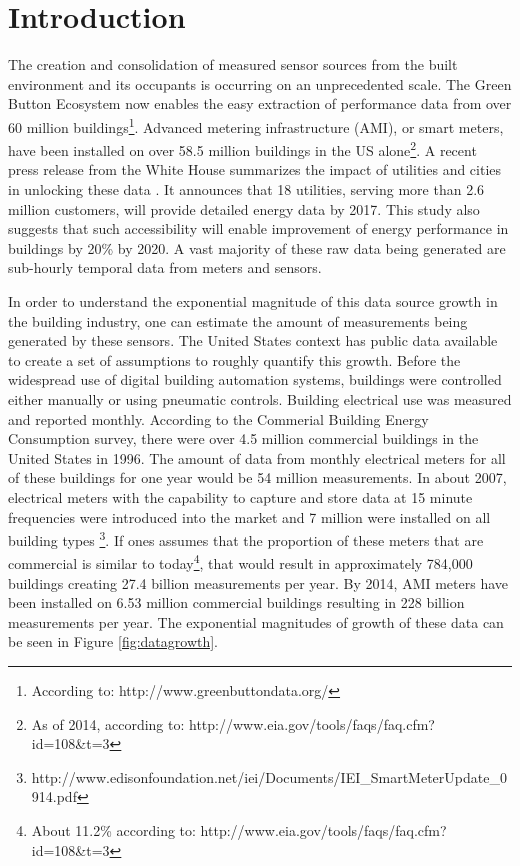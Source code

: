 \section{Introduction}
\label{sec:intro}

The creation and consolidation of measured sensor sources from the built environment and its occupants is occurring on an unprecedented scale. The Green Button Ecosystem now enables the easy extraction of performance data from over 60 million buildings\footnote{According to: http://www.greenbuttondata.org/}. Advanced metering infrastructure (AMI), or smart meters, have been installed on over 58.5 million buildings in the US alone\footnote{As of 2014, according to: http://www.eia.gov/tools/faqs/faq.cfm?id=108&t=3}. A recent press release from the White House summarizes the impact of utilities and cities in unlocking these data \cite{the_white_house_fact_2016}. It announces that 18 utilities, serving more than 2.6 million customers, will provide detailed energy data by 2017. This study also suggests that such accessibility will enable improvement of energy performance in buildings by 20\% by 2020. A vast majority of these raw data being generated are sub-hourly temporal data from meters and sensors.

In order to understand the exponential magnitude of this data source growth in the building industry, one can estimate the amount of measurements being generated by these sensors. The United States context has public data available to create a set of assumptions to roughly quantify this growth. Before the widespread use of digital building automation systems, buildings were controlled either manually or using pneumatic controls. Building electrical use was measured and reported monthly. According to the Commerial Building Energy Consumption survey, there were over 4.5 million commercial buildings in the United States in 1996. The amount of data from monthly electrical meters for all of these buildings for one year would be 54 million measurements. In about 2007, electrical meters with the capability to capture and store data at 15 minute frequencies were introduced into the market and 7 million were installed on all building types \footnote{http://www.edisonfoundation.net/iei/Documents/IEI_SmartMeterUpdate_0914.pdf}. If ones assumes that the proportion of these meters that are commercial is similar to today\footnote{About 11.2\% according to: http://www.eia.gov/tools/faqs/faq.cfm?id=108&t=3}, that would result in approximately 784,000 buildings creating 27.4 billion measurements per year. By 2014, AMI meters have been installed on 6.53 million commercial buildings resulting in 228 billion measurements per year. The exponential magnitudes of growth of these data can be seen in Figure \ref{fig:datagrowth}.
